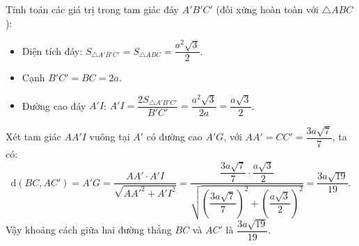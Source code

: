 \begin{ex}
{\begin{itemchoice}
		Tính toán các giá trị trong tam giác đáy $A'B'C'$ (đối xứng hoàn toàn với $\triangle ABC$):
		\begin{itemize}
			\item Diện tích đáy: $S_{\triangle A'B'C'} = S_{\triangle ABC} = \dfrac{a^2\sqrt{3}}{2}$.
			\item Cạnh $B'C' = BC = 2a$.
			\item Đường cao đáy $A'I$: $A'I = \dfrac{2S_{\triangle A'B'C'}}{B'C'} = \dfrac{a^2\sqrt{3}}{2a} = \dfrac{a\sqrt{3}}{2}$.
		\end{itemize}
		Xét tam giác $AA'I$ vuông tại $A'$ có đường cao $A'G$, với $AA' = CC' = \dfrac{3a\sqrt{7}}{7}$, ta có:
		$$\mathrm{d}(BC, AC') = A'G = \dfrac{AA' \cdot A'I}{\sqrt{AA'^2 + A'I^2}} = \dfrac{\dfrac{3a\sqrt{7}}{7} \cdot \dfrac{a\sqrt{3}}{2}}{\sqrt{\left(\dfrac{3a\sqrt{7}}{7}\right)^2 + \left(\dfrac{a\sqrt{3}}{2}\right)^2}} = \dfrac{3a\sqrt{19}}{19}.$$
		Vậy khoảng cách giữa hai đường thẳng $BC$ và $AC'$ là $\dfrac{3a\sqrt{19}}{19}$.
		
		\end{itemchoice}
	}
\end{ex}

